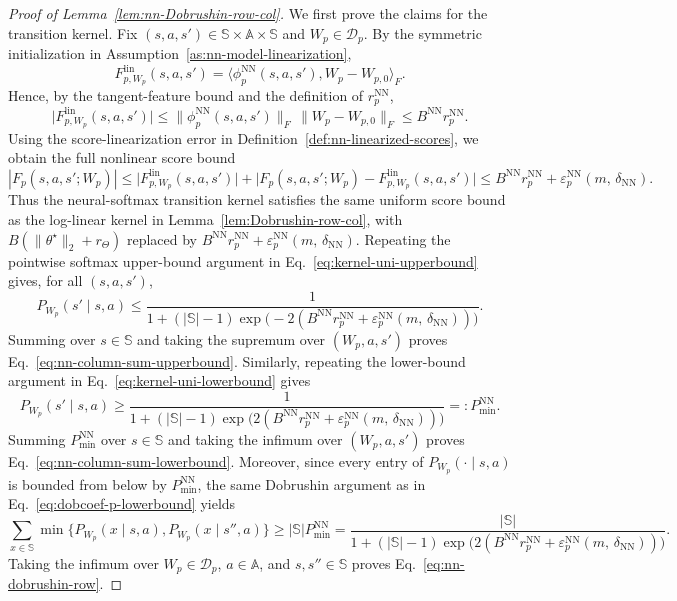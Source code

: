 \documentclass[10pt]{article} %
\theoremstyle{plain}
\theoremstyle{definition}
\theoremstyle{remark}
\newcommand{\bA}{\mathbb{A}}
\newcommand{\bS}{\mathbb{S}}
\begin{document}
\begin{proof}[Proof of Lemma~\ref{lem:nn-Dobrushin-row-col}]
We first prove the claims for the transition kernel. Fix \((s,a,s')\in\bS\times\bA\times\bS\) and \(W_p\in\mathcal D_p\). By the symmetric initialization in Assumption~\ref{as:nn-model-linearization},
\[
F_{p,W_p}^{\mathrm{lin}}(s,a,s')=\big\langle \phi_p^{\mathrm{NN}}(s,a,s'),W_p-W_{p,0}\big\rangle_F .
\]
Hence, by the tangent-feature bound and the definition of \(r_p^{\mathrm{NN}}\),
\[
\big|F_{p,W_p}^{\mathrm{lin}}(s,a,s')\big|
\le \|\phi_p^{\mathrm{NN}}(s,a,s')\|_F\,\|W_p-W_{p,0}\|_F
\le B^{\mathrm{NN}}r_p^{\mathrm{NN}}.
\]
Using the score-linearization error in Definition~\ref{def:nn-linearized-scores}, we obtain the full nonlinear score bound
\[
|F_p(s,a,s';W_p)|
\le \big|F_{p,W_p}^{\mathrm{lin}}(s,a,s')\big|
+\big|F_p(s,a,s';W_p)-F_{p,W_p}^{\mathrm{lin}}(s,a,s')\big|
\le B^{\mathrm{NN}}r_p^{\mathrm{NN}}+\varepsilon_{p}^{\mathrm{NN}}(m,\,\delta_{\mathrm{NN}}).
\]
Thus the neural-softmax transition kernel satisfies the same uniform score bound as the log-linear kernel in Lemma~\ref{lem:Dobrushin-row-col}, with \(B(\|\theta^\star\|_2+r_\Theta)\) replaced by \(B^{\mathrm{NN}}r_p^{\mathrm{NN}}+\varepsilon_{p}^{\mathrm{NN}}(m,\,\delta_{\mathrm{NN}})\). Repeating the pointwise softmax upper-bound argument in Eq.~\ref{eq:kernel-uni-upperbound} gives, for all \((s,a,s')\),
\[
P_{W_p}(s'\mid s,a)
\le
\frac{1}{1+(|\bS|-1)\exp\!\bigl(-2(B^{\mathrm{NN}}r_p^{\mathrm{NN}}+\varepsilon_{p}^{\mathrm{NN}}(m,\,\delta_{\mathrm{NN}}))\bigr)}.
\]
Summing over \(s\in\bS\) and taking the supremum over \((W_p,a,s')\) proves Eq.~\ref{eq:nn-column-sum-upperbound}. Similarly, repeating the lower-bound argument in Eq.~\ref{eq:kernel-uni-lowerbound} gives
\[
P_{W_p}(s'\mid s,a)
\ge
\frac{1}{1+(|\bS|-1)\exp\!\bigl(2(B^{\mathrm{NN}}r_p^{\mathrm{NN}}+\varepsilon_{p}^{\mathrm{NN}}(m,\,\delta_{\mathrm{NN}}))\bigr)}
=:P_{\min}^{\mathrm{NN}}.
\]
Summing \(P_{\min}^{\mathrm{NN}}\) over \(s\in\bS\) and taking the infimum over \((W_p,a,s')\) proves Eq.~\ref{eq:nn-column-sum-lowerbound}. Moreover, since every entry of \(P_{W_p}(\cdot\mid s,a)\) is bounded from below by \(P_{\min}^{\mathrm{NN}}\), the same Dobrushin argument as in Eq.~\ref{eq:dobcoef-p-lowerbound} yields
\[
\sum_{x\in\bS}\min\{P_{W_p}(x\mid s,a),P_{W_p}(x\mid s'',a)\}
\ge
|\bS|P_{\min}^{\mathrm{NN}}
=
\frac{|\bS|}{1+(|\bS|-1)\exp\!\bigl(2(B^{\mathrm{NN}}r_p^{\mathrm{NN}}+\varepsilon_{p}^{\mathrm{NN}}(m,\,\delta_{\mathrm{NN}}))\bigr)}.
\]
Taking the infimum over \(W_p\in\mathcal D_p\), \(a\in\bA\), and \(s,s''\in\bS\) proves Eq.~\ref{eq:nn-dobrushin-row}.


\end{proof}
\end{document}
